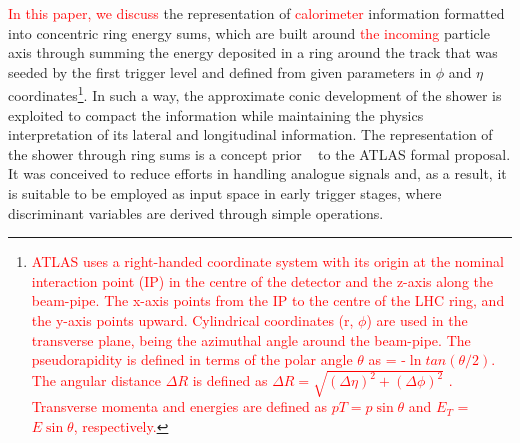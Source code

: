 \textcolor{red}{In this paper, we discuss} the representation of \textcolor{red}{calorimeter} information formatted into concentric ring energy sums, which are built around \textcolor{red}{the incoming} particle axis through summing the energy deposited in a ring around the track that was seeded by the first trigger level and defined from given parameters in $\phi$ and $\eta$ coordinates\footnote{\textcolor{red}{ATLAS uses a right-handed coordinate system with its origin at the nominal interaction point (IP) in the centre of the detector and the z-axis along the beam-pipe. The x-axis points from the IP to the centre of the LHC ring, and the y-axis points upward. Cylindrical coordinates (r, $\phi$) are used in the transverse plane, \phi being the azimuthal angle around the beam-pipe. The pseudorapidity is defined in terms of the polar angle $\theta$ as \eta = -$\ln{tan(\theta/2)}$. The angular distance $\Delta R$ is defined as $\Delta R = \sqrt{(\Delta\eta)^{2} + (\Delta\phi)^{2}}$ . Transverse momenta and energies are defined as $pT = p\sin\theta$ and $E_{T}$ = $E\sin\theta$, respectively.}}. In such a way, the approximate conic development of the shower is exploited to compact the information while maintaining the physics interpretation of its lateral and longitudinal information. The representation of the shower through ring sums is a concept prior ~\cite{1992_spacal_rings} to the ATLAS formal proposal. It was conceived to reduce efforts in handling analogue signals and, as a result, it is suitable to be employed as input space in early trigger stages, where discriminant variables are derived through simple operations.





